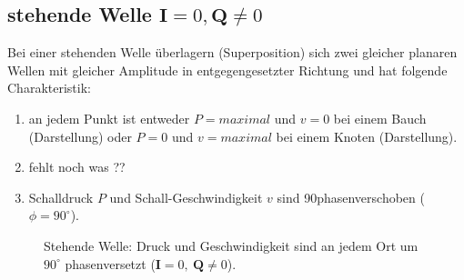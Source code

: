 \subsection{stehende Welle $\mathbf{I} = 0,\mathbf{Q} \neq 0$
\label{helmholtz:subsection:stehendeWelle}}

Bei einer stehenden Welle überlagern (Superposition) sich zwei gleicher planaren Wellen mit gleicher Amplitude in entgegengesetzter Richtung und hat folgende Charakteristik:

\begin{enumerate}
\item an jedem Punkt ist entweder  $P = maximal$ und $v = 0$ bei einem Bauch (Darstellung) oder $P = 0$  und $ v = maximal$ bei einem Knoten (Darstellung).
\item fehlt noch was ??
\item Schalldruck $P$ und Schall-Geschwindigkeit $v$ sind 90\textdegree phasenverschoben ($\phi = 90^{\circ}$).
\end{enumerate}

\begin{figure}
\centering
{}
\caption{Stehende Welle: Druck und Geschwindigkeit sind an jedem Ort um $90^\circ$ phasenversetzt ($\mathbf I=0,\ \mathbf Q\neq0$).}
\end{figure}

